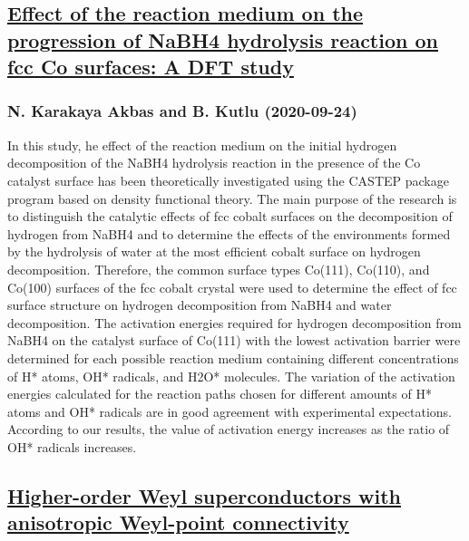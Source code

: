 \subsection*{\href{http://arxiv.org/abs/2009.11420v1}{Effect of the reaction medium on the progression of NaBH4 hydrolysis  reaction on fcc Co surfaces: A DFT study}}
\subsubsection*{N. Karakaya Akbas and B. Kutlu (2020-09-24)}
In this study, he effect of the reaction medium on the initial hydrogen
decomposition of the NaBH4 hydrolysis reaction in the presence of the Co
catalyst surface has been theoretically investigated using the CASTEP package
program based on density functional theory. The main purpose of the research is
to distinguish the catalytic effects of fcc cobalt surfaces on the
decomposition of hydrogen from NaBH4 and to determine the effects of the
environments formed by the hydrolysis of water at the most efficient cobalt
surface on hydrogen decomposition. Therefore, the common surface types Co(111),
Co(110), and Co(100) surfaces of the fcc cobalt crystal were used to determine
the effect of fcc surface structure on hydrogen decomposition from NaBH4 and
water decomposition. The activation energies required for hydrogen
decomposition from NaBH4 on the catalyst surface of Co(111) with the lowest
activation barrier were determined for each possible reaction medium containing
different concentrations of H* atoms, OH* radicals, and H2O* molecules. The
variation of the activation energies calculated for the reaction paths chosen
for different amounts of H* atoms and OH* radicals are in good agreement with
experimental expectations. According to our results, the value of activation
energy increases as the ratio of OH* radicals increases.

\subsection*{\href{http://arxiv.org/abs/2009.11419v1}{Higher-order Weyl superconductors with anisotropic Weyl-point  connectivity}}
